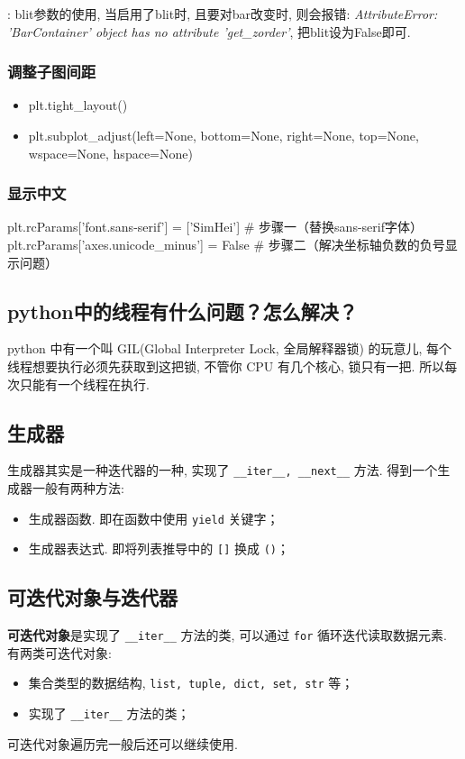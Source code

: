 : blit参数的使用, 当启用了blit时, 且要对bar改变时, 则会报错: \textit{AttributeError: 'BarContainer' object has no attribute 'get\_zorder'}, 把blit设为False即可. 


\subsubsection{调整子图间距}
\begin{itemize}
	\item plt.tight\_layout()
	\item plt.subplot\_adjust(left=None, bottom=None, right=None, top=None, wspace=None, hspace=None)
\end{itemize}

\subsubsection{显示中文}
\begin{python}
	plt.rcParams['font.sans-serif'] = ['SimHei'] # 步骤一（替换sans-serif字体）  
	plt.rcParams['axes.unicode_minus'] = False  # 步骤二（解决坐标轴负数的负号显示问题）
\end{python}

\subsection{python中的线程有什么问题？怎么解决？}
python 中有一个叫 GIL(Global Interpreter Lock, 全局解释器锁) 的玩意儿, 每个线程想要执行必须先获取到这把锁, 不管你 CPU 有几个核心, 锁只有一把. 所以每次只能有一个线程在执行. 

 
\subsection{生成器}
生成器其实是一种迭代器的一种, 实现了 \texttt{__iter__, __next__} 方法. 得到一个生成器一般有两种方法: 
\begin{itemize}
	\item 生成器函数. 即在函数中使用 \texttt{yield} 关键字；
	
	\item 生成器表达式. 即将列表推导中的 \texttt{[]} 换成 \texttt{()}；
\end{itemize}
 
\subsection{可迭代对象与迭代器}
\textbf{可迭代对象}是实现了 \texttt{__iter__} 方法的类, 可以通过 \texttt{for} 循环迭代读取数据元素. 有两类可迭代对象: 
\begin{itemize}
	\item 集合类型的数据结构, \texttt{list, tuple, dict, set, str} 等；
	
	\item 实现了 \texttt{__iter__} 方法的类；
\end{itemize}
可迭代对象遍历完一般后还可以继续使用. 

